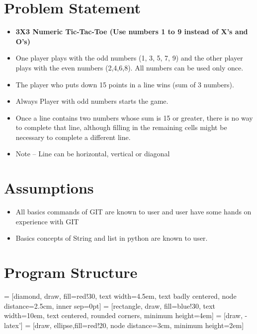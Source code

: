 \documentclass[11pt,oneside]{book}
\begin{document}
\section{Problem Statement}
\begin{itemize}
    \item \textbf{3X3 Numeric Tic-Tac-Toe (Use numbers 1 to 9 instead of X’s and O’s)}
    \item One player plays with the odd numbers (1, 3, 5, 7, 9) and the other player plays with the even numbers (2,4,6,8). All numbers can be used only once. 
    \item The player who puts down 15 points in a line wins (sum of 3 numbers). 
    \item Always Player with odd numbers starts the game. 
    \item Once a line contains two numbers whose sum is 15 or greater, there is no way to complete that line, although filling in the remaining cells might be necessary to complete a different line.
    \item Note – Line can be horizontal, vertical or diagonal

\end{itemize}

\section{Assumptions}
\begin{itemize}
    \item All basics commands of GIT are known to user and user have some hands on experience with GIT
    \item Basics concepts of String and list in python are known to user.
\end{itemize}

\section{Program Structure}

 = [diamond, draw, fill=red!30, 
    text width=4.5em, text badly centered, node distance=2.5cm, inner sep=0pt]
 = [rectangle, draw, fill=blue!30, 
    text width=10em, text centered, rounded corners, minimum height=4em]
 = [draw, -latex']
 = [draw, ellipse,fill=red!20, node distance=3cm,
    minimum height=2em]
    
\end{document}
